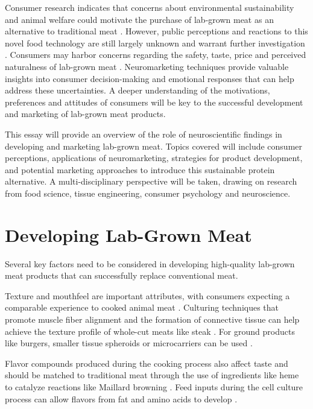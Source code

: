 \documentclass[10pt]{article}
\begin{document}
\begin{sloppypar}
  Consumer research indicates that concerns about environmental sustainability and animal welfare could motivate the purchase of lab-grown meat as an alternative to traditional meat \citep{circus_exploring_2018}. However, public perceptions and reactions to this novel food technology are still largely unknown and warrant further investigation \citep{verbeke_would_2015}. Consumers may harbor concerns regarding the safety, taste, price and perceived naturalness of lab-grown meat \citep{bryant_consumer_2018}. Neuromarketing techniques provide valuable insights into consumer decision-making and emotional responses that can help address these uncertainties. A deeper understanding of the motivations, preferences and attitudes of consumers will be key to the successful development and marketing of lab-grown meat products.

  This essay will provide an overview of the role of neuroscientific findings in developing and marketing lab-grown meat. Topics covered will include consumer perceptions, applications of neuromarketing, strategies for product development, and potential marketing approaches to introduce this sustainable protein alternative. A multi-disciplinary perspective will be taken, drawing on research from food science, tissue engineering, consumer psychology and neuroscience.

  \section{Developing Lab-Grown Meat}
  \label{sec:developing-lab-grown-meat}

  Several key factors need to be considered in developing high-quality lab-grown meat products that can successfully replace conventional meat.

  Texture and mouthfeel are important attributes, with consumers expecting a comparable experience to cooked animal meat \citep{datar_possibilities_2010}. Culturing techniques that promote muscle fiber alignment and the formation of connective tissue can help achieve the texture profile of whole-cut meats like steak \citep{post_cultured_2012}. For ground products like burgers, smaller tissue spheroids or microcarriers can be used \citep{specht_opportunities_2018}.

  Flavor compounds produced during the cooking process also affect taste and should be matched to traditional meat through the use of ingredients like heme to catalyze reactions like Maillard browning \citep{post_cultured_2012}. Feed inputs during the cell culture process can allow flavors from fat and amino acids to develop \citep{kumar_-vitro_2021}.


\end{sloppypar}
\end{document}
